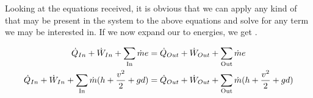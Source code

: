 Looking at the equations received, it is obvious that we can apply any kind of  that may be present in the system to the above equations and solve for any term we may be interested in.
If we now expand our  to energies, we get .

\begin{equation}\label{eq:Energy_Continuity_Equation}
  \begin{aligned}
    \dot{Q}_{In} + \dot{W}_{In} + \sum\limits_{\text{In}} \dot{m} e &= \dot{Q}_{Out} + \dot{W}_{Out} + \sum\limits_{\text{Out}} \dot{m} e \\
    \dot{Q}_{In} + \dot{W}_{In} + \sum\limits_{\text{In}} \dot{m} (h + \frac{v^{2}}{2} + g d) &= \dot{Q}_{Out} + \dot{W}_{Out} + \sum\limits_{\text{Out}} \dot{m} (h + \frac{v^{2}}{2} + g d)
  \end{aligned}
\end{equation}


